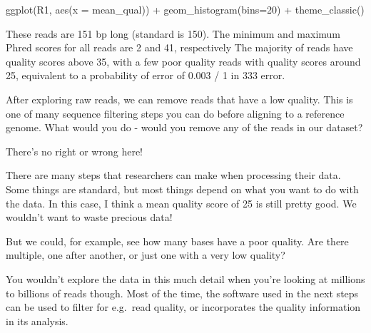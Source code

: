 \documentclass[
  letterpaper,
  DIV=11,
  numbers=noendperiod]{scrreprt}
\newenvironment{Shaded}{}{}
\newcommand{\AttributeTok}[1]{\textcolor[rgb]{0.84,0.23,0.29}{#1}}
\newcommand{\DecValTok}[1]{\textcolor[rgb]{0.00,0.36,0.77}{#1}}
\newcommand{\FunctionTok}[1]{\textcolor[rgb]{0.44,0.26,0.76}{#1}}
\newcommand{\NormalTok}[1]{\textcolor[rgb]{0.14,0.16,0.18}{#1}}
\newcommand{\SpecialCharTok}[1]{\textcolor[rgb]{0.00,0.36,0.77}{#1}}
\begin{document}
\begin{tcolorbox}
\begin{Shaded}
\begin{Highlighting}[]
\FunctionTok{ggplot}\NormalTok{(R1, }\FunctionTok{aes}\NormalTok{(}\AttributeTok{x =}\NormalTok{ mean\_qual)) }\SpecialCharTok{+} \FunctionTok{geom\_histogram}\NormalTok{(}\AttributeTok{bins=}\DecValTok{20}\NormalTok{) }\SpecialCharTok{+} \FunctionTok{theme\_classic}\NormalTok{()}
\end{Highlighting}
\end{Shaded}

These reads are 151 bp long (standard is 150). The minimum and maximum
Phred scores for all reads are 2 and 41, respectively The majority of
reads have quality scores above 35, with a few poor quality reads with
quality scores around 25, equivalent to a probability of error of 0.003
/ 1 in 333 error.

\end{tcolorbox}

After exploring raw reads, we can remove reads that have a low quality.
This is one of many sequence filtering steps you can do before aligning
to a reference genome. What would you do - would you remove any of the
reads in our dataset?

\begin{tcolorbox}[enhanced jigsaw, arc=.35mm, left=2mm, titlerule=0mm, rightrule=.15mm, colframe=quarto-callout-tip-color-frame, coltitle=black, colback=white, opacityback=0, bottomtitle=1mm, bottomrule=.15mm, colbacktitle=quarto-callout-tip-color!10!white, breakable, title=\textcolor{quarto-callout-tip-color}{\faLightbulb}\hspace{0.5em}{Answer}, toptitle=1mm, toprule=.15mm, opacitybacktitle=0.6, leftrule=.75mm]

There's no right or wrong here!

There are many steps that researchers can make when processing their
data. Some things are standard, but most things depend on what you want
to do with the data. In this case, I think a mean quality score of 25 is
still pretty good. We wouldn't want to waste precious data!

But we could, for example, see how many bases have a poor quality. Are
there multiple, one after another, or just one with a very low quality?

You wouldn't explore the data in this much detail when you're looking at
millions to billions of reads though. Most of the time, the software
used in the next steps can be used to filter for e.g.~read quality, or
incorporates the quality information in its analysis.

\end{tcolorbox}
\end{document}
